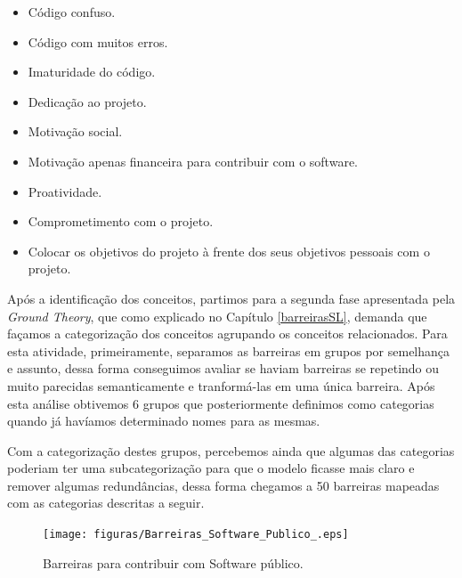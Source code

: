 \begin{itemize}
\item Código confuso.
\item Código com muitos erros.
\item Imaturidade do código.
%
\item Dedicação ao projeto.
\item Motivação social.
\item Motivação apenas financeira para contribuir com o software.
\item Proatividade.
\item Comprometimento com o projeto.
\item Colocar os objetivos do projeto à frente dos seus objetivos pessoais com o projeto.
%

\end{itemize}

Após a identificação dos conceitos, partimos para a segunda fase apresentada pela
\textit{Ground Theory}, que como explicado no Capítulo \ref{barreirasSL}, demanda que  
façamos a categorização dos conceitos agrupando os conceitos relacionados. Para esta 
atividade, primeiramente, separamos as barreiras em grupos por semelhança e assunto,
dessa forma conseguimos avaliar se haviam barreiras se repetindo ou muito parecidas
semanticamente e tranformá-las em uma única barreira. Após esta análise obtivemos 6 
grupos que posteriormente definimos como categorias quando já havíamos determinado
nomes para as mesmas. 

Com a categorização destes grupos, percebemos ainda que algumas das categorias
poderiam ter uma subcategorização para que o modelo ficasse mais claro e remover
algumas redundâncias, dessa forma chegamos a 50 barreiras mapeadas com as categorias
descritas a seguir.


\begin{figure}[h]
	\centering
	\label{fig:SPbarreiras}
		\texttt{[image: figuras/Barreiras\_Software\_Publico\_.eps]}
	\caption{Barreiras para contribuir com Software público.}
\end{figure}


